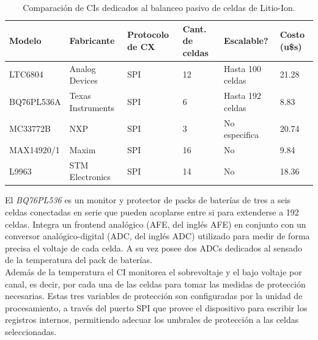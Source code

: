 \documentclass[10pt,a4paper]{article}
\begin{document}
\begin{itemize}
\begin{table}[h!]
    \begin{center}
        \begin{tabular}{llllll}
        \hline
        Modelo     & Fabricante        & Protocolo de CX    & Cant. de celdas & Escalable?          & Costo (u\$s) \\ \hline
        LTC6804    & Analog Devices    & SPI                & 12              & Hasta 100 celdas    & 21.28        \\
        BQ76PL536A & Texas Instruments & SPI                & 6               & Hasta 192 celdas    & 8.83         \\
        MC33772B   & NXP               & SPI                & 3               & No especifica       & 20.74        \\
        MAX14920/1 & Maxim             & SPI                & 16              & No                  & 9.84         \\
        L9963      & STM Electronics   & SPI                & 14              & No                  & 18.36        \\        
        \hline
        \end{tabular}
    \end{center}
    \caption{Comparaci\'on de \acrshort{CI}s dedicados al balanceo pasivo de
    celdas de Litio-Ion.}
    \label{tabla_comparativa_ics}
\end{table}

\begin{minipage}{0.5\textwidth}
El \emph{BQ76PL536} es un monitor y protector de packs de bater\'ias de tres a
seis celdas conectadas en serie que pueden acoplarse entre si para extenderse a
192 celdas. Integra un frontend anal\'ogico (\acrshort{AFE}, del
ingl\'es \acrlong{AFE}) en conjunto con un conversor anal\'ogico-digital
(\acrshort{ADC}, del ingl\'es \acrlong{ADC}) utilizado para medir de forma
precisa el voltaje de cada celda. A su vez posee dos \acrshort{ADC}s dedicados
al sensado de la temperatura del pack de bater\'ias.\\

Adem\'as de la temperatura el \acrshort{CI} monitorea el sobrevoltaje y el bajo
voltaje por canal, es decir, por cada una de las celdas para tomar las medidas de
protecci\'on necesarias. Estas tres variables de protecci\'on son configuradas
por la unidad de procesamiento, a trav\'es del puerto SPI que provee el
dispositivo para escribir los registros internos, permitiendo adecuar los
umbrales de protección a las celdas seleccionadas.\\


\end{minipage}
\end{itemize}
\end{document}
